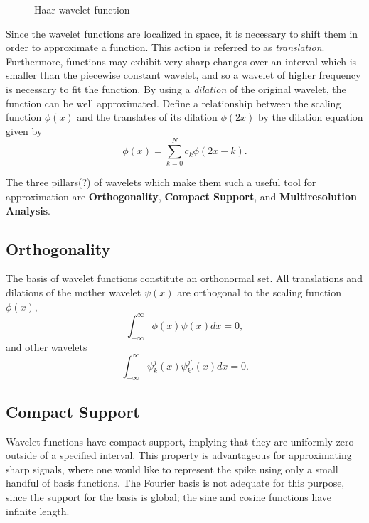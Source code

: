 \documentclass[11pt]{article}
\begin{document}
\begin{figure}[H]
	\centering
	
	\caption{Haar wavelet function}
	\label{fig:haar_wavelet}
\end{figure}
Since the wavelet functions are localized in space, it is necessary to shift them in order to approximate
a function. This action is referred to as \textit{translation}. Furthermore, functions may exhibit very sharp changes over an
interval which is smaller than the piecewise constant wavelet, and so a wavelet of higher frequency is necessary
to fit the function. By using a \textit{dilation} of the original wavelet, the function can be well approximated. 
Define a relationship between the scaling function $\phi(x)$ and the translates of its dilation 
$\phi(2x)$ by the dilation equation given by
\begin{equation}
\phi(x) = \sum_{k=0}^{N} c_k \phi(2x-k).
\label{dilation equation}
\end{equation}

The three pillars(?) of wavelets which make them such a useful tool for approximation are \textbf{Orthogonality}, 
\textbf{Compact Support}, and \textbf{Multiresolution Analysis}.
\subsection{Orthogonality}
The basis of wavelet functions constitute an orthonormal set. All translations and dilations of the mother wavelet $\psi(x)$
are orthogonal to the scaling function $\phi(x)$, 
\begin{equation}
\int_{-\infty}^{\infty} \phi(x) \psi(x) dx = 0,
\end{equation}
and other wavelets
\begin{equation}
\int_{-\infty}^{\infty} \psi_{k}^{j}(x) \psi_{k'}^{j'}(x) dx = 0.
\end{equation}
\subsection{Compact Support}
Wavelet functions have compact support, implying that they are uniformly zero outside of a specified interval.
This property is advantageous for approximating sharp signals, where one would like to represent the spike using only a small 
handful of basis functions. The Fourier basis is not adequate for this purpose, since the support for the basis is global; 
the sine and cosine functions have infinite length. 
\end{document}
